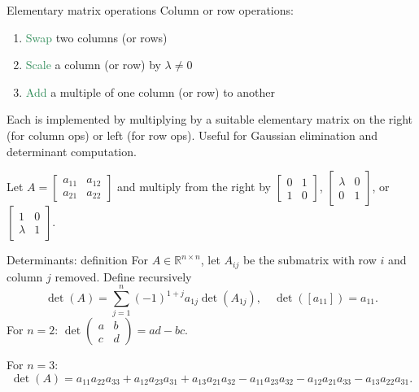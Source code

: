 \documentclass[11pt,aspectratio=169]{beamer}
\begin{document}
\begin{frame}{Elementary matrix operations}
Column or row operations:
\begin{enumerate}
\item \textcolor{SeaGreen}{Swap} two columns (or rows)
\item \textcolor{SeaGreen}{Scale} a column (or row) by $\lambda\neq 0$
\item \textcolor{SeaGreen}{Add} a multiple of one column (or row) to another
\end{enumerate}
Each is implemented by multiplying by a suitable elementary matrix on the right (for column ops) or left (for row ops). Useful for Gaussian elimination and determinant computation.

\begin{block}{}
	Let $A=\begin{bmatrix}
	a_{11} & a_{12}\\
	a_{21} & a_{22}
\end{bmatrix}$ and multiply from the right by $\begin{bmatrix}
	0 & 1\\
	1 & 0
\end{bmatrix}$, $\begin{bmatrix}
	\lambda & 0\\
	0 & 1
\end{bmatrix}$, or $\begin{bmatrix}
	1 & 0\\
	\lambda & 1
\end{bmatrix}$.
\end{block}

\end{frame}


\begin{frame}{Determinants: definition}
For $A\in\mathbb{R}^{n\times n}$, let $A_{ij}$ be the submatrix with row $i$ and column $j$ removed. Define recursively
\[
\det(A)=\sum_{j=1}^n (-1)^{1+j} a_{1j} \det(A_{1j}),\quad \det([a_{11}])=a_{11}.
\]
For $n=2$: $\det\begin{pmatrix}a&b\\ c&d\end{pmatrix}=ad-bc$.
\bigskip

For $n=3$:
\[
\det(A)=a_{11}a_{22}a_{33}+a_{12}a_{23}a_{31}+a_{13}a_{21}a_{32}
- a_{11}a_{23}a_{32}-a_{12}a_{21}a_{33}-a_{13}a_{22}a_{31}.
\]
\end{frame}
\end{document}
